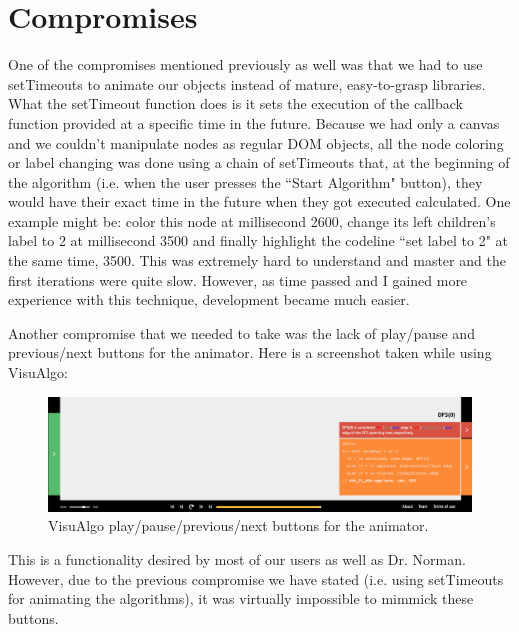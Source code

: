 \documentclass{l4proj}
\begin{document}
\section{Compromises}

One of the compromises mentioned previously as well was that we had to use setTimeouts to animate our objects instead
of mature, easy-to-grasp libraries. What the setTimeout function does is it sets the execution of the callback function
provided at a specific time in the future. Because we had only a canvas and we couldn't manipulate nodes as regular DOM
objects, all the node coloring or label changing was done using a chain of setTimeouts that, at the beginning of the
algorithm (i.e. when the user presses the ``Start Algorithm" button), they would have their exact time in the future
when they got executed calculated. One example might be: color this node at millisecond 2600, change its left
children's label to 2 at millisecond 3500 and finally highlight the codeline ``set label to 2" at the same time, 3500.
This was extremely hard to understand and master and the first iterations were quite slow. However, as time passed and
I gained more experience with this technique, development became much easier.

Another compromise that we needed to take was the lack of play/pause and previous/next buttons for the animator. Here
is a screenshot taken while using VisuAlgo:

\begin{figure}[!ht]
    \centering
    \includegraphics[scale=0.35]{play-pause-previous-next}
    \caption{VisuAlgo play/pause/previous/next buttons for the animator.}
    \label{fig:play-pause-previous-next}
\end{figure}

This is a functionality desired by most of our users as well as Dr. Norman. However, due to the previous compromise we
have stated (i.e. using setTimeouts for animating the algorithms), it was virtually impossible to mimmick these
buttons.

\end{document}
